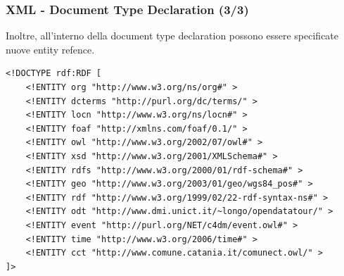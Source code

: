 \documentclass[8pt]{beamer}
\begin{document}
\begin{frame}[fragile]
 \frametitle{XML - Document Type Declaration (3/3)}
 Inoltre, all'interno della document type declaration possono essere
 specificate nuove entity refence.

\begin{small}
\begin{verbatim}
<!DOCTYPE rdf:RDF [
    <!ENTITY org "http://www.w3.org/ns/org#" >
    <!ENTITY dcterms "http://purl.org/dc/terms/" >
    <!ENTITY locn "http://www.w3.org/ns/locn#" >
    <!ENTITY foaf "http://xmlns.com/foaf/0.1/" >
    <!ENTITY owl "http://www.w3.org/2002/07/owl#" >
    <!ENTITY xsd "http://www.w3.org/2001/XMLSchema#" >
    <!ENTITY rdfs "http://www.w3.org/2000/01/rdf-schema#" >
    <!ENTITY geo "http://www.w3.org/2003/01/geo/wgs84_pos#" >
    <!ENTITY rdf "http://www.w3.org/1999/02/22-rdf-syntax-ns#" >
    <!ENTITY odt "http://www.dmi.unict.it/~longo/opendatatour/" >
    <!ENTITY event "http://purl.org/NET/c4dm/event.owl#" >
    <!ENTITY time "http://www.w3.org/2006/time#" >
    <!ENTITY cct "http://www.comune.catania.it/comunect.owl/" >
]>
\end{verbatim}
\end{small}
\end{frame}
\end{document}
